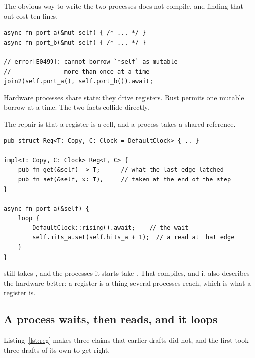 The obvious way to write the two processes does not compile, and finding
that out cost ten lines.

\begin{lstlisting}[caption={What does not compile, and the error it gives. This is the code a Rust programmer writes first.},label={lst:e0499}]
async fn port_a(&mut self) { /* ... */ }
async fn port_b(&mut self) { /* ... */ }

// error[E0499]: cannot borrow `*self` as mutable
//               more than once at a time
join2(self.port_a(), self.port_b()).await;
\end{lstlisting}

Hardware processes share state: they drive registers. Rust permits one
mutable borrow at a time. The two facts collide directly.

The repair is that a register is a cell, and a process takes a shared
reference.

\begin{lstlisting}[caption={The repair. A register is a cell several processes reach, which is what a register is. Reading and driving it are plain; the wait is the edge.},label={lst:reg}]
pub struct Reg<T: Copy, C: Clock = DefaultClock> { .. }

impl<T: Copy, C: Clock> Reg<T, C> {
    pub fn get(&self) -> T;      // what the last edge latched
    pub fn set(&self, x: T);     // taken at the end of the step
}

async fn port_a(&self) {
    loop {
        DefaultClock::rising().await;    // the wait
        self.hits_a.set(self.hits_a + 1);  // a read at that edge
    }
}
\end{lstlisting}

 still takes , and the processes it starts take
. That compiles, and it also describes the hardware better: a
register is a thing several processes reach, which is what a register is.

\subsection{A process waits, then reads, and it loops}
\label{sec:e-regread}

Listing~\ref{lst:reg} makes three claims that earlier drafts did not,
and the first took three drafts of its own to get right.

